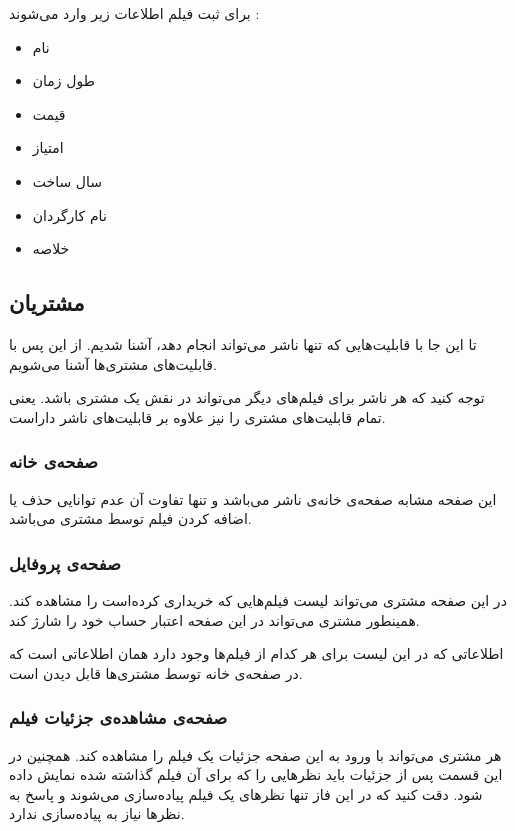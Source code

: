 \documentclass{utap}
\begin{document}
	برای ثبت فیلم اطلاعات زیر وارد می‌شوند :
		\begin{itemize}
			\item نام 
			\item طول زمان  
			\item قیمت 
			\item امتیاز 
			\item سال ساخت
			\item نام کارگردان
			\item خلاصه‌
		\end{itemize}
	
	\subsection{مشتریان}
	تا این جا با قابلیت‌هایی که تنها ناشر می‌تواند انجام دهد، آشنا شدیم.
	از این پس با قابلیت‌های مشتری‌ها آشنا می‌شویم.
	
	توجه کنید که هر ناشر برای فیلم‌های دیگر می‌تواند در نقش یک مشتری باشد.
	یعنی تمام قابلیت‌های مشتری را نیز علاوه بر قابلیت‌های ناشر داراست.
	
	
	
		\subsubsection{صفحه‌ی خانه}
	
	این صفحه مشابه صفحه‌ی خانه‌ی ناشر می‌باشد و تنها تفاوت آن عدم توانایی حذف یا اضافه کردن فیلم توسط مشتری می‌باشد. 
	
		\subsubsection{صفحه‌ی پروفایل}
		در این صفحه مشتری می‌تواند لیست فیلم‌هایی که خریداری کرده‌است را مشاهده کند. همینطور مشتری می‌تواند در این صفحه اعتبار حساب خود را شارژ کند. 
		
		اطلاعاتی که در این لیست برای هر کدام از فیلم‌ها وجود دارد همان اطلاعاتی‌ است که در صفحه‌ی خانه توسط مشتری‌ها قابل دیدن است.
	
		\subsubsection{صفحه‌ی مشاهده‌ی جزئیات فیلم }
		
		هر مشتری می‌تواند با ورود به این صفحه جزئیات یک فیلم را مشاهده کند. همچنین در این قسمت پس از جزئیات باید نظرهایی را که برای آن فیلم گذاشته شده نمایش داده شود. دقت کنید که در این فاز تنها نظر‌های یک فیلم پیاده‌سازی می‌شوند و پاسخ به نظر‌ها نیاز به پیاده‌سازی ندارد.
		
\end{document}

